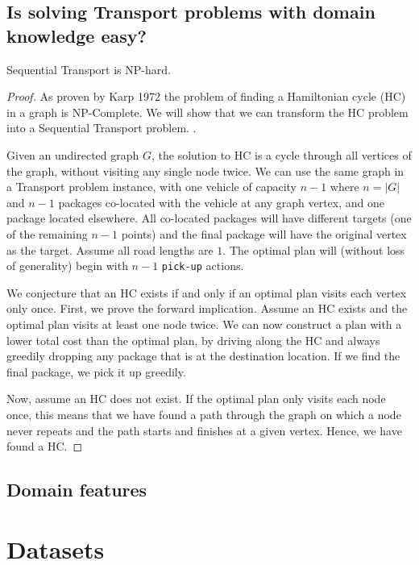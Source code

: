 \subsection{Is solving Transport problems with domain knowledge easy?}

\begin{thm}
Sequential Transport is NP-hard.
\end{thm}
\begin{proof}
As proven by Karp 1972 \TODO{} the problem of finding a Hamiltonian cycle (HC) in a graph is NP-Complete. We will show that we can transform the HC problem  into a Sequential Transport problem. .

Given an undirected graph $G$, the solution to HC is a cycle through all vertices of the graph, without visiting any single node twice. We can use the same graph in a Transport problem instance, with one vehicle of capacity $n-1$ where $n = |G|$ and  $n-1$ packages co-located with the vehicle at any graph vertex, and one package located elsewhere. All co-located packages will have different targets (one of the remaining $n-1$ points) and the final package will have the original vertex as the target. Assume all road lengths are $1$. The optimal plan will (without loss of generality) begin with $n-1$ \verb+pick-up+ actions.

We conjecture that an HC exists if and only if an optimal plan visits each vertex only once. First, we prove the forward implication. Assume an HC exists and the optimal plan visits at least one node twice. We can now construct a plan with a lower total cost than the optimal plan, by driving along the HC and always greedily dropping any package that is at the destination location. If we find the final package, we pick it up greedily.

Now, assume an HC does not exist. If the optimal plan only visits each node once, this means that we have found a path through the graph on which a node never repeats and the path starts and finishes at a given vertex. Hence, we have found a HC.
\end{proof}

\subsection{Domain features}


\section{Datasets}

